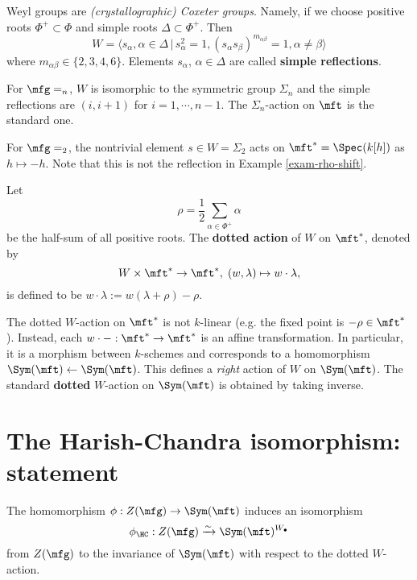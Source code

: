 \begin{rem}
	Weyl groups are \emph{(crystallographic) Coxeter groups}. Namely, if we choose positive roots $\Phi^+\subset \Phi$ and simple roots $\mathsf{\Delta}\subset \Phi^+$. Then
	\[
		W  = \langle s_\alpha, \alpha\in \mathsf{\Delta} \,\vert\, s_\alpha^2=1, (s_\alpha s_\beta)^{m_{\alpha\beta}}=1, \alpha\neq \beta \rangle
	\]
	where $m_{\alpha\beta}\in \{2,3,4,6\}$. Elements $s_\alpha$, $\alpha\in \Delta$ are called \textbf{simple reflections}.
\end{rem}

\begin{exam}
	For $\mfg=\sl_n$, $W$ is isomorphic to the symmetric group $\Sigma_n$ and the simple reflections are $(i,i+1)$ for $i=1,\cdots,n-1$. The $\Sigma_n$-action on $\mft$ is the standard one.
\end{exam}

\begin{exam}
	For $\mfg=\sl_2$, the nontrivial element $s\in W=\Sigma_2$ acts on $\mft^* = \Spec(k[h])$ as $h\mapsto -h$. Note that this is not the reflection in Example \ref{exam-rho-shift}.
\end{exam}

\begin{defn}
	Let 
	\[
		\rho = \frac{1}{2}\sum_{\alpha\in \Phi^+} \alpha
	\]
	be the half-sum of all positive roots. The \textbf{dotted action} of $W$ on $\mft^*$, denoted by
	\[
		W\times \mft^* \to \mft^*,\; (w,\lambda)\mapsto w\cdot \lambda,
	\]
	is defined to be $w\cdot \lambda := w(\lambda+\rho)-\rho$.
\end{defn}

\begin{constr}
	The dotted $W$-action on $\mft^*$ is not $k$-linear (e.g. the fixed point is $-\rho\in \mft^*$). Instead, each $w\cdot -: \mft^* \to \mft^*$ is an affine transformation. In particular, it is a morphism between $k$-schemes and corresponds to a homomorphism $\Sym(\mft)\gets \Sym(\mft)$. This defines a \emph{right} action of $W$ on $\Sym(\mft)$. The standard \textbf{dotted} $W$-action on $\Sym(\mft)$ is obtained by taking inverse.
\end{constr}

\section{The Harish-Chandra isomorphism: statement}


\begin{thm}
	\label{thm-HC}
	The homomorphism $\phi: Z(\mfg) \to \Sym(\mft)$ induces an isomorphism
	\[
		\phi_\HC: Z(\mfg)  \xrightarrow{\sim} \Sym(\mft)^{W_\bullet}
	\]
	from $Z(\mfg)$ to the invariance of $\Sym(\mft)$ with respect to the dotted $W$-action.

\end{thm}
 
